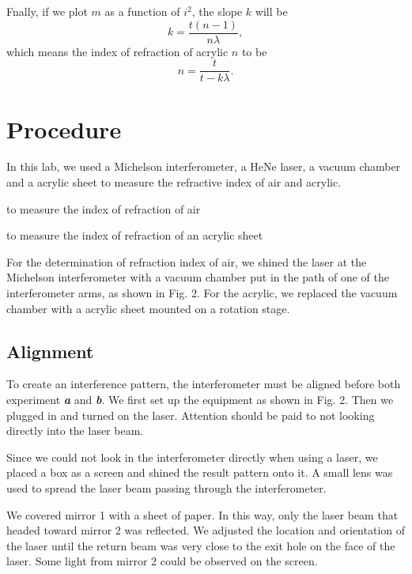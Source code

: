 \documentclass[12pt]{article}
\begin{document}
Fnally, if we plot $m$ as a function of $i^{2}$, the slope $k$ will be
\begin{equation}
	k=\dfrac{t(n-1)}{n\lambda},
\end{equation}
which means the index of refraction of acrylic $n$ to be 
\begin{equation}
	n=\dfrac{t}{t-k\lambda}.
\end{equation}

\section{Procedure}
In this lab, we used a Michelson interferometer, a HeNe laser, a vacuum chamber and a acrylic sheet to measure the refractive index of air and acrylic. 
\begin{enumerate}
	\begin{item}
	 to measure the index of refraction of air
	\end{item}
	\begin{item}
		to measure the index of refraction of an acrylic sheet
	\end{item}
\end{enumerate}

For the determination of refraction index of air, we shined the laser at the Michelson interferometer with a vacuum chamber put in the path of one of the interferometer arms, as shown in Fig. 2. For the acrylic, we replaced the vacuum chamber with a acrylic sheet mounted on a rotation stage. 
\subsection{Alignment}
To create an interference pattern, the interferometer must be aligned before both experiment \textit{\textbf{a}} and \textit{\textbf{b}}. We first set up the equipment as shown in Fig. 2. Then we plugged in and turned on the laser. Attention should be paid to not looking directly into the laser beam. 

Since we could not look in the interferometer directly when using a laser, we placed a box as a screen and shined the result pattern onto it. A small lens was used to spread the laser beam passing through the interferometer. 

We covered mirror 1 with a sheet of paper. In this way, only the laser beam that headed toward mirror 2 was reflected. We adjusted the location and orientation of the laser until the return beam was very close to the exit hole on the face of the laser. Some light from mirror 2 could be observed on the screen. 
\end{document}
